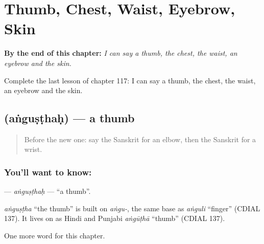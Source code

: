 
\chapter{Thumb, Chest, Waist, Eyebrow, Skin}
\label{ch:sa-thumb-chest-waist-eyebrow-skin}

\begin{chapteropening}
\textbf{By the end of this chapter:} \emph{I can say a thumb, the chest, the waist, an eyebrow and the skin.}

Complete the last lesson of chapter 117: I can say a thumb, the chest, the waist, an eyebrow and the skin.
\end{chapteropening}

\section[\texorpdfstring{\sk{अंगुष्ठः} (aṅguṣṭhaḥ)}{अंगुष्ठः (aṅguṣṭhaḥ)}]{ (aṅguṣṭhaḥ) — a thumb}

\label{lesson:SA-C117-angusthah}



\begin{quote}
Before the new one: say the Sanskrit for an elbow, then the Sanskrit for a wrist.
\end{quote}

\subsection*{You'll want to know: }
\textbf{} — \emph{aṅguṣṭhaḥ} — \textquotedblleft{}a thumb\textquotedblright{}.

\begin{cousinweb}
\emph{aṅguṣṭha} \textquotedblleft{}the thumb\textquotedblright{} is built on \emph{aṅgu-}, the same base as \emph{aṅguli} \textquotedblleft{}finger\textquotedblright{} (CDIAL 137). It lives on as Hindi and Punjabi \emph{aṅgūṭhā} \textquotedblleft{}thumb\textquotedblright{} (CDIAL 137).
\end{cousinweb}

\begin{grammarlens}[title={What you've built}]
One more word for this chapter.
\end{grammarlens}

